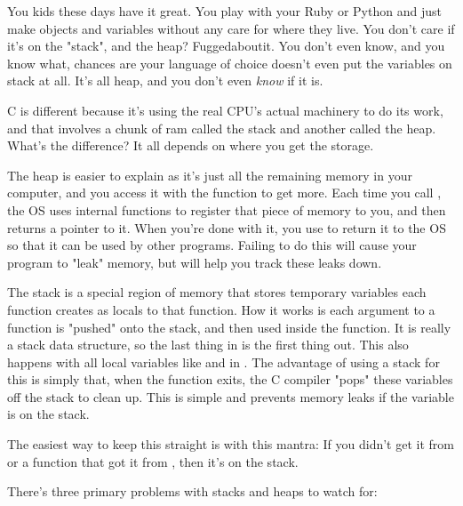 You kids these days have it great.  You play with your Ruby or Python and 
just make objects and variables without any care for where they live.  You
don't care if it's on the "stack", and the heap?  Fuggedaboutit.  You don't
even know, and you know what, chances are your language of choice doesn't
even put the variables on stack at all.  It's all heap, and you don't even
\emph{know} if it is.

C is different because it's using the real CPU's actual machinery to do its
work, and that involves a chunk of ram called the stack and another 
called the heap.  What's the difference?  It all depends on where you
get the storage.

The heap is easier to explain as it's just all the remaining memory in
your computer, and you access it with the function  to
get more.  Each time you call , the OS uses internal 
functions to register that piece of memory to you, and then returns
a pointer to it.  When you're done with it, you use  to
return it to the OS so that it can be used by other programs.  Failing
to do this will cause your program to "leak" memory, but 
will help you track these leaks down.

The stack is a special region of memory that stores temporary variables each
function creates as locals to that function.  How it works is each argument to
a function is "pushed" onto the stack, and then used inside the function.  It
is really a stack data structure, so the last thing in is the first thing out.
This also happens with all local variables like  and
 in .  The advantage of using a stack for this is
simply that, when the function exits, the C compiler "pops" these variables off
the stack to clean up.  This is simple and prevents memory leaks if the
variable is on the stack.

The easiest way to keep this straight is with this mantra:  If you
didn't get it from  or a function that got it from ,
then it's on the stack.

There's three primary problems with stacks and heaps to watch for:

